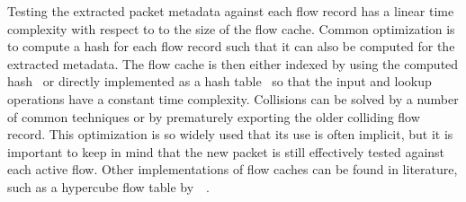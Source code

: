 Testing the extracted packet metadata against each flow record has a linear time complexity with respect to to the size of the flow cache. Common optimization is to compute a hash for each flow record such that it can also be computed for the extracted metadata. The flow cache is then either indexed by using the computed hash~\cite{Molina-2006-Design} or directly implemented as a hash table~\cite{Estan-2004-Building} so that the input and lookup operations have a constant time complexity. Collisions can be solved by a number of common techniques or by prematurely exporting the older colliding flow record. This optimization is so widely used that its use is often implicit, but it is important to keep in mind that the new packet is still effectively tested against each active flow. Other implementations of flow caches can be found in literature, such as a hypercube flow table by~\citeauthor{Wang-2011-Memory}~\cite{Wang-2011-Memory}.

